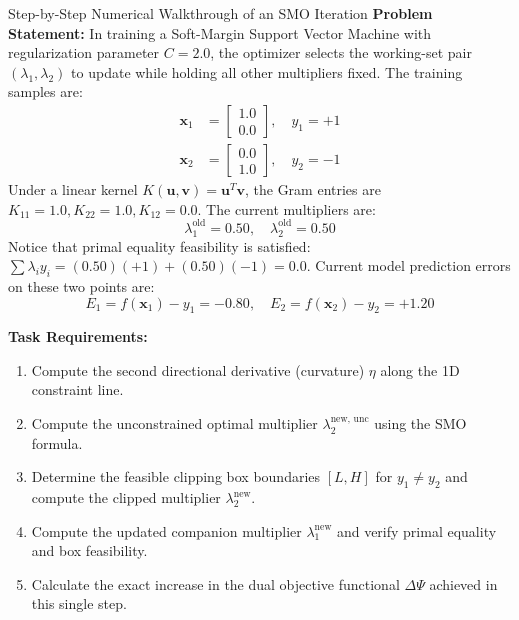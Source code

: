 \begin{examplebox}[breakable]{Step-by-Step Numerical Walkthrough of an SMO Iteration}
\textbf{Problem Statement:}
In training a Soft-Margin Support Vector Machine with regularization parameter $C = 2.0$, the optimizer selects the working-set pair $(\lambda_1, \lambda_2)$ to update while holding all other multipliers fixed.
The training samples are:
\begin{align}
\mathbf{x}_1 &= \begin{bmatrix} 1.0 \\ 0.0 \end{bmatrix}, \quad y_1 = +1 \\
\mathbf{x}_2 &= \begin{bmatrix} 0.0 \\ 1.0 \end{bmatrix}, \quad y_2 = -1
\end{align}
Under a linear kernel $K(\mathbf{u}, \mathbf{v}) = \mathbf{u}^T \mathbf{v}$, the Gram entries are $K_{11} = 1.0, K_{22} = 1.0, K_{12} = 0.0$.
The current multipliers are:
\begin{equation}
\lambda_1^{\text{old}} = 0.50, \quad \lambda_2^{\text{old}} = 0.50
\end{equation}
Notice that primal equality feasibility is satisfied: $\sum \lambda_i y_i = (0.50)(+1) + (0.50)(-1) = 0.0$.
Current model prediction errors on these two points are:
\begin{equation}
E_1 = f(\mathbf{x}_1) - y_1 = -0.80, \quad E_2 = f(\mathbf{x}_2) - y_2 = +1.20
\end{equation}

\textbf{Task Requirements:}
\begin{enumerate}
    \item Compute the second directional derivative (curvature) $\eta$ along the 1D constraint line.
    \item Compute the unconstrained optimal multiplier $\lambda_2^{\text{new, unc}}$ using the SMO formula.
    \item Determine the feasible clipping box boundaries $[L, H]$ for $y_1 \ne y_2$ and compute the clipped multiplier $\lambda_2^{\text{new}}$.
    \item Compute the updated companion multiplier $\lambda_1^{\text{new}}$ and verify primal equality and box feasibility.
    \item Calculate the exact increase in the dual objective functional $\Delta \Psi$ achieved in this single step.
\end{enumerate}


\end{examplebox}
